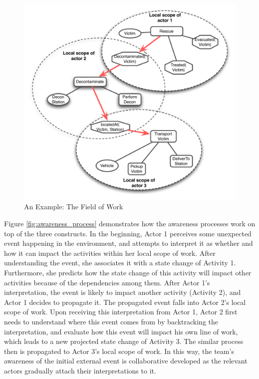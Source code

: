 \begin{figure}[htbp] %
   \centering
   \includegraphics[width=4.5in]{field_of_work.pdf} 
   \caption{An Example: The Field of Work}
   \label{fig:field_of_work}
\end{figure}

Figure \ref{fig:awareness_process} demonstrates how the awareness processes work on top of the three constructs. In the beginning, Actor 1 perceives some unexpected event happening in the environment, and attempts to interpret it as whether and how it can impact the activities within her local scope of work. After understanding the event, she associates it with a state change of Activity 1. Furthermore, she predicts how the state change of this activity will impact other activities because of the dependencies among them. After Actor 1’s interpretation, the event is likely to impact another activity (Activity 2), and Actor 1 decides to propagate it. The propagated event falls into Actor 2’s local scope of work. Upon receiving this interpretation from Actor 1, Actor 2 first needs to understand where this event comes from by backtracking the interpretation, and evaluate how this event will impact his own line of work, which leads to a new projected state change of Activity 3. The similar process then is propagated to Actor 3’s local scope of work. In this way, the team’s awareness of the initial external event is collaborative developed as the relevant actors gradually attach their interpretations to it. 

